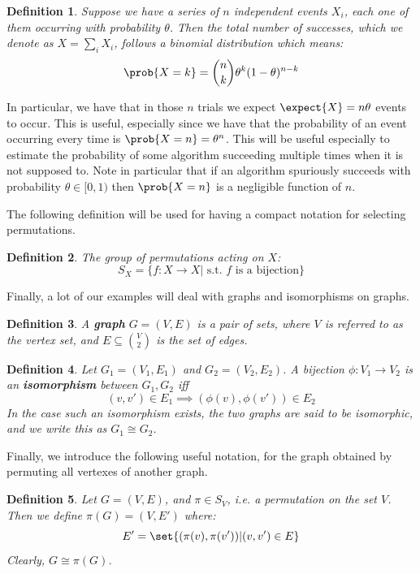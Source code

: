 \documentclass{article}
\newtheorem{definition}{Definition}
\begin{document}
\begin{definition}
    Suppose we have a series of $n$ independent events $X_i$, each one of them
    occurring with probability $\theta$. Then the total number of successes, which we denote as $X = \sum_i X_i$, follows a binomial distribution which means:
    \[ \prob{X = k} = \binom{n}{k} \theta^k (1 - \theta)^{n - k} \]
\end{definition}
In particular, we have that in those $n$ trials we expect $\expect{X} = n\theta$ events to occur. This is useful, especially since
we have that the probability of an event occurring every time is $\prob{X = n} = \theta^n$. This will be useful especially
to  estimate the probability of some algorithm succeeding multiple times when it is not supposed to.
Note in particular that if an algorithm spuriously succeeds with probability $\theta \in [0, 1)$ then $\prob{X = n}$ is a
negligible function of $n$. \par

The following definition will be used for having a compact notation for selecting permutations.

\begin{definition}
    The group of permutations acting on $X$:
    \[ S_X = \{ f: X \to X | \text{ s.t. } f \text{ is a bijection} \} \]
\end{definition}

Finally, a lot of our examples will deal with graphs and isomorphisms on graphs.

\begin{definition}
    A \textbf{graph} $G = (V, E)$ is a pair of sets, where $V$ is referred to as the vertex set, and $E \subseteq \binom{V}{2}$ is the set of edges.
\end{definition}

\begin{definition}
    Let $G_1 = (V_1, E_1)$ and $G_2 = (V_2, E_2)$. A bijection $\phi: V_1 \to V_2$ is an \textbf{isomorphism} between $G_1, G_2$ iff
    \[ (v, v') \in E_1 \implies (\phi(v), \phi(v')) \in E_2 \]
    In the case such an isomorphism exists, the two graphs are said to be isomorphic, and we write this as $G_1 \cong G_2$.
\end{definition}

Finally, we introduce the following useful notation, for the graph obtained by permuting all vertexes of another graph.
\begin{definition}
    Let $G = (V, E)$, and $\pi \in S_V$, i.e. a permutation on the set $V$. Then we define $\pi(G) = (V, E')$ where:
    \[ E' = \set{ (\pi(v), \pi(v')) | (v, v') \in E } \]
    Clearly, $G \cong \pi(G)$.
\end{definition}
\end{document}
